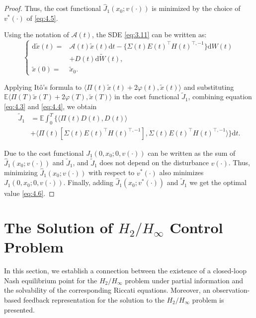 \documentclass[lettersize,journal]{IEEEtran}
\theoremstyle{plain}
\theoremstyle{definition}
\begin{document}
\begin{proof}
	Thus, the cost functional $\widehat{J}_1(x_0;v(\cdot))$ is minimized by the choice of $v^*(\cdot)$ of \eqref{eq:4.5}.
	
	Using the notation of $\mathcal{A}(t)$, the SDE \eqref{eq:3.11} can be written as:
	\begin{equation*}
		\left\{
		\begin{aligned}
			\mathrm{d}\widetilde{x}(t) =& \mathcal{A}(t)\widetilde{x}(t)\mathrm{d}t - \Big\{\Sigma(t)E(t)^{\top}H(t)^{\top,-1}\Big\}\mathrm{d}W(t) \\
			&+ D(t)\mathrm{d}\widetilde{W}(t),\\
			\widetilde{x}(0) = &\widetilde{x}_0.
		\end{aligned}
		\right.
	\end{equation*}
	
	Applying It\^{o}'s formula to $\langle \Pi(t)\widetilde{x}(t) + 2\varphi(t),\widetilde{x}(t) \rangle$ and substituting $\mathbb{E} \langle \Pi(T)\widetilde{x}(T) + 2\varphi(T),\widetilde{x}(T) \rangle$ in the cost functional $\widetilde{J}_1$, combining equation \eqref{eq:4.3} and \eqref{eq:4.4}, we obtain
	\begin{equation}\label{eq:4.9}
		\begin{aligned}
			\widetilde{J}_1& = \mathbb{E} \int_0^T \Big\{\langle \Pi(t)D(t),D(t) \rangle \\
			&+ \langle \Pi(t)[\Sigma(t)E(t)^{\top}H(t)^{\top,-1}],\Sigma(t)E(t)^{\top}H(t)^{\top,-1} \rangle\Big\} \mathrm{d}t.
		\end{aligned}
	\end{equation}
	
	Due to the cost functional $J_1(0,x_0;0,v(\cdot))$ can be written as the sum of $\widehat{J}_1(x_0;v(\cdot))$ and $\widetilde{J}_1$, and $\widetilde{J}_1$ does not depend on the disturbance $v(\cdot)$. Thus, minimizing $\widehat{J}_1(x_0;v(\cdot))$ with respect to $v^*(\cdot)$ also minimizes $J_1(0,x_0;0,v(\cdot))$. Finally, adding $\widehat{J}_1(x_0;v^*(\cdot))$ and $\widetilde{J}_1$ we get the optimal value \eqref{eq:4.6}.
\end{proof}

\section{The Solution of $H_2/H_\infty$ Control Problem}\label{sec5}
In this section, we establish a connection between the existence of a closed-loop Nash equilibrium point for the $H_2/H_\infty$ problem under partial information and the solvability of the corresponding Riccati equations. Moreover, an observation-based feedback representation for the solution to the $H_2/H_\infty$ problem is presented.
\end{document}
